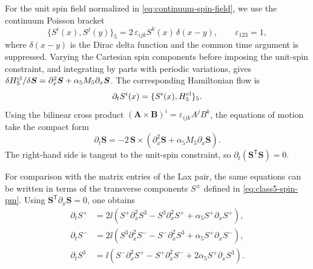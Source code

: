 For the unit spin field normalized in \eqref{eq:continuum-spin-field}, we use
the continuum Poisson bracket
\begin{equation}
\{S^i(x),S^j(y)\}_5
=
2\,\varepsilon_{ijk}S^k(x)\,\delta(x-y),
\qquad
\varepsilon_{123}=1,
\label{eq:class5-poisson-bracket}
\end{equation}
where $\delta(x-y)$ is the Dirac delta function and the common time argument
is suppressed.  Varying the Cartesian spin components before imposing the
unit-spin constraint, and integrating by parts with periodic variations,
gives $\delta H^{\rm cl}_5/\delta\boldsymbol S
=\partial_x^2\boldsymbol S+\alpha_5M_5\partial_x\boldsymbol S$.
The corresponding Hamiltonian flow is
\begin{equation}
\partial_t S^i(x)=\{S^i(x),H^{\rm cl}_5\}_5.
\label{eq:class5-hamiltonian-flow-definition}
\end{equation}
Using the bilinear cross product
$(\boldsymbol A\times\boldsymbol B)^i
=\varepsilon_{ijk}A^jB^k$, the equations of motion take the compact form
\begin{equation}
\partial_t\boldsymbol S
=
-2\,\boldsymbol S\times
\left(
\partial_x^2\boldsymbol S
+\alpha_5 M_5\partial_x\boldsymbol S
\right).
\label{eq:class5-vector-eom}
\end{equation}
The right-hand side is tangent to the unit-spin constraint, so
$\partial_t(\boldsymbol S^{\mathsf T}\boldsymbol S)=0$.

For comparison with the matrix entries of the Lax pair, the same equations
can be written in terms of the transverse components $S^{\pm}$ defined in
\eqref{eq:class5-spin-pm}.  Using
$\boldsymbol S^{\mathsf T}\partial_x\boldsymbol S=0$, one obtains
\begin{align}
\partial_t S^+
&=
2\ii\left(
S^+\partial_x^2S^3
-S^3\partial_x^2S^+
+\alpha_5 S^+\partial_xS^+
\right),
\label{eq:class5-eom-plus}\\
\partial_t S^-
&=
2\ii\left(
S^3\partial_x^2S^-
-S^-\partial_x^2S^3
+\alpha_5 S^+\partial_xS^-
\right),
\label{eq:class5-eom-minus}\\
\partial_t S^3
&=
\ii\left(
S^-\partial_x^2S^+
-S^+\partial_x^2S^-
+2\alpha_5 S^+\partial_xS^3
\right).
\label{eq:class5-eom-three}
\end{align}

